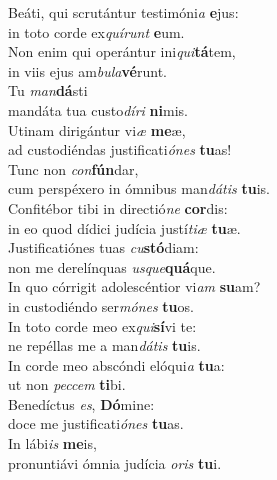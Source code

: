 \evenverse Beáti, qui scrutántur testimóni\textit{a} \textbf{e}jus:~\*\\
\evenverse in toto corde ex\textit{quí}\textit{runt} \textbf{e}um.\\
\oddverse Non enim qui operántur ini\textit{qui}\textbf{tá}tem,~\*\\
\oddverse in viis ejus am\textit{bu}\textit{la}\textbf{vé}runt.\\
\evenverse Tu \textit{man}\textbf{dá}sti~\*\\
\evenverse mandáta tua custo\textit{dí}\textit{ri} \textbf{ni}mis.\\
\oddverse Utinam dirigántur vi\textit{æ} \textbf{me}æ,~\*\\
\oddverse ad custodiéndas justificati\textit{ó}\textit{nes} \textbf{tu}as!\\
\evenverse Tunc non \textit{con}\textbf{fún}dar,~\*\\
\evenverse cum perspéxero in ómnibus man\textit{dá}\textit{tis} \textbf{tu}is.\\
\oddverse Confitébor tibi in directió\textit{ne} \textbf{cor}dis:~\*\\
\oddverse in eo quod dídici judícia justí\textit{ti}\textit{æ} \textbf{tu}æ.\\
\evenverse Justificatiónes tuas \textit{cu}\textbf{stó}diam:~\*\\
\evenverse non me derelínquas \textit{us}\textit{que}\textbf{quá}que.\\
\oddverse In quo córrigit adolescéntior vi\textit{am} \textbf{su}am?~\*\\
\oddverse in custodiéndo ser\textit{mó}\textit{nes} \textbf{tu}os.\\
\evenverse In toto corde meo ex\textit{qui}\textbf{sí}vi te:~\*\\
\evenverse ne repéllas me a man\textit{dá}\textit{tis} \textbf{tu}is.\\
\oddverse In corde meo abscóndi elóqui\textit{a} \textbf{tu}a:~\*\\
\oddverse ut non \textit{pec}\textit{cem} \textbf{ti}bi.\\
\evenverse Benedíctus \textit{es}, \textbf{Dó}mine:~\*\\
\evenverse doce me justificati\textit{ó}\textit{nes} \textbf{tu}as.\\
\oddverse In lábi\textit{is} \textbf{me}is,~\*\\
\oddverse pronuntiávi ómnia judícia \textit{o}\textit{ris} \textbf{tu}i.\\
